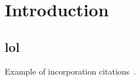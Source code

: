 \section{Introduction}
\label{sec:intro}

\subsection{lol}
Example of incorporation citations~\cite{coral:nsdi04}.

